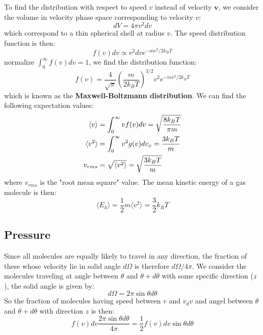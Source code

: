 \documentclass{article}
\begin{document}
To find the distribution with respect to speed $v$ instead of velocity $\mathbf{v}$, we 
consider the volume in velocity phase space corresponding to velocity $v$:
\begin{equation}
    dV = 4\pi v^2 dv
\end{equation}
which correspond to a thin spherical shell at radius $v$. The speed distribution function is then:
\begin{equation}
    f(v) dv \propto v^2 dv e^{-mv^2/2k_BT}
\end{equation}
normalize $\int_0^{\infty}f(v)dv = 1$, we find the distribution function:
\begin{equation}
    f(v) = \frac{4}{\sqrt{\pi}}\left(\frac{m}{2k_BT}\right)^{3/2} v^2 e^{-mv^2/2k_BT}
\end{equation}
which is known as the \textbf{Maxwell-Boltzmann distribution}. 
We can find the following expectation values:
\begin{align}
    \langle v \rangle &= \int_{0}^{\infty} v f(v) dv = \sqrt{\frac{8k_BT}{\pi m}} \notag \\
    \langle v^2 \rangle &= \int_{0}^{\infty} v^2 g(v) dv_x = \frac{3k_BT}{m} \notag  \\
    v_{rms} &= \sqrt{\langle v^2 \rangle} = \sqrt{\frac{3k_BT}{m}}
\end{align}
where $v_{rms}$ is the "root mean square" value. 
The mean kinetic energy of a gas molecule is then:
\begin{equation}
    \langle E_k \rangle = \frac{1}{2}m \langle v^2 \rangle = \frac{3}{2}k_BT
\end{equation}

\subsection*{Pressure}
Since all molecules are equally likely to travel in any direction, the fraction of these 
whose velocity lie in solid angle $d\Omega$ is therefore $d\Omega/4\pi$. We consider the 
molecules traveling at angle between $\theta$ and $\theta + d\theta$ with some specific direction ($z$),
the solid angle is given by:
\begin{equation}
    d\Omega = 2\pi \sin\theta d\theta
\end{equation}
So the fraction of molecules having speed between $v$ and $v_dv$ and angel between $\theta$ 
and $\theta + d\theta$ with direction $z$ is then:
\begin{equation}
    f(v) dv \frac{2\pi \sin\theta d\theta}{4\pi} = \frac{1}{2} f(v) dv \sin\theta d\theta 
\end{equation}
\end{document}
